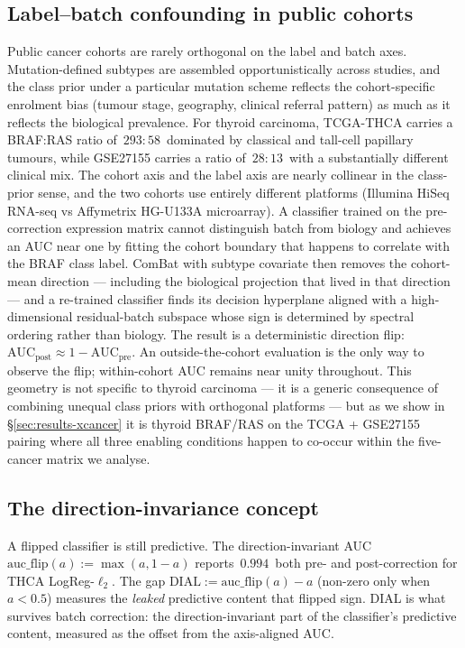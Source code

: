 \documentclass[11pt,a4paper]{article}
\begin{document}
\subsection{Label--batch confounding in public cohorts}
Public cancer cohorts are rarely orthogonal on the label and batch
axes. Mutation-defined subtypes are assembled opportunistically
across studies, and the class prior under a particular mutation scheme
reflects the cohort-specific enrolment bias (tumour stage, geography,
clinical referral pattern) as much as it reflects the biological
prevalence. For thyroid carcinoma, TCGA-THCA \citep{tcga2014thca}
carries a BRAF:RAS ratio of $\,293:58\,$ dominated by classical and
tall-cell papillary tumours, while GSE27155
\citep{giordano2005thyroid} carries a ratio of $\,28:13\,$ with a
substantially different clinical mix. The cohort axis and the label
axis are nearly collinear in the class-prior sense, and the two
cohorts use entirely different platforms (Illumina HiSeq RNA-seq vs
Affymetrix HG-U133A microarray). A classifier trained on the
pre-correction expression matrix cannot distinguish batch from
biology and achieves an AUC near one by fitting the cohort boundary
that happens to correlate with the BRAF class label. ComBat with
subtype covariate then removes the cohort-mean direction --- including
the biological projection that lived in that direction --- and a
re-trained classifier finds its decision hyperplane aligned with a
high-dimensional residual-batch subspace whose sign is determined by
spectral ordering rather than biology. The result is a deterministic
direction flip: $\mathrm{AUC}_{\mathrm{post}} \approx
1 - \mathrm{AUC}_{\mathrm{pre}}$. An outside-the-cohort evaluation is
the only way to observe the flip; within-cohort AUC remains near
unity throughout. This geometry is not specific to thyroid carcinoma
--- it is a generic consequence of combining unequal class priors
with orthogonal platforms --- but as we show in
\S\ref{sec:results-xcancer} it is thyroid BRAF/RAS on the TCGA +
GSE27155 pairing where all three enabling conditions happen to
co-occur within the five-cancer matrix we analyse.

\subsection{The direction-invariance concept}
A flipped classifier is still predictive. The direction-invariant AUC
$\mathrm{auc\_flip}(a) := \max(a, 1-a)$ reports $\,0.994\,$ both
pre- and post-correction for THCA LogReg-$\ell_2$. The gap
$\mathrm{DIAL} := \mathrm{auc\_flip}(a) - a$ (non-zero only when
$a < 0.5$) measures the \emph{leaked} predictive content that flipped
sign. DIAL is what survives batch correction: the direction-invariant
part of the classifier's predictive content, measured as the offset
from the axis-aligned AUC.
\end{document}
